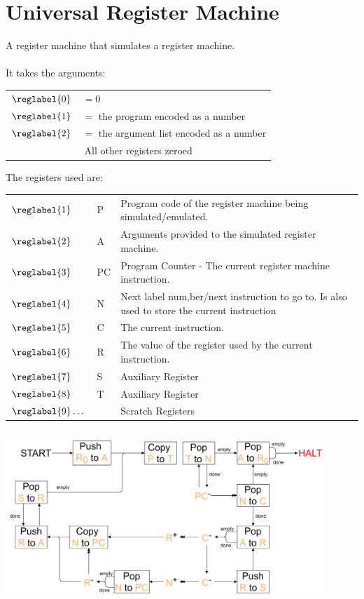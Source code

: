 \section{Universal Register Machine}
A register machine that simulates a register machine.
\\
\\ It takes the arguments:
\begin{center}
    \begin{tabular}{l p{}}
        $\reglabel{0}$ & $= 0$ \\
        $\reglabel{1}$ & $= $ the program encoded as a number \\
        $\reglabel{2}$ & $= $ the argument list encoded as a number \\
        \multicolumn{2}{c}{All other registers zeroed} \\
    \end{tabular}
\end{center}
The registers used are:
\begin{center}
	\begin{tabular}{l l p{}}
		$\reglabel{1}$      & P  & Program code of the register machine being simulated/emulated.                              \\
		$\reglabel{2}$      & A  & Arguments provided to the simulated register machine.                                       \\
		$\reglabel{3}$      & PC & Program Counter - The current register machine instruction.                                 \\
		$\reglabel{4}$      & N  & Next label num,ber/next instruction to go to. Is also used to store the current instruction \\
		$\reglabel{5}$      & C  & The current instruction.                                                                    \\
		$\reglabel{6}$      & R  & The value of the register used by the current instruction.                                  \\
		$\reglabel{7}$      & S  & Auxiliary Register                                                                          \\
		$\reglabel{8}$      & T  & Auxiliary Register                                                                          \\
		$\reglabel{9}\dots$ &    & Scratch Registers                                                                           \\
	\end{tabular}
\end{center}
\inputminted{python}{register_machines/code/universal_register_machine.py}
\begin{center}
    \includegraphics[width=0.9\textwidth]{register_machines/images/universal_register_machine.drawio.png}
\end{center}
